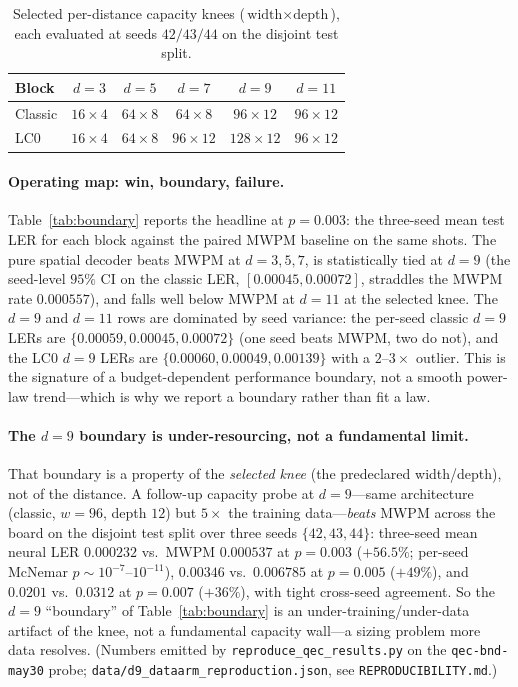 \documentclass[11pt,a4paper]{article}
\begin{document}
\begin{table}[htbp]
\centering
\caption{Selected per-distance capacity knees
($\textrm{width}\times\textrm{depth}$), each evaluated at seeds $42/43/44$
on the disjoint test split.}
\label{tab:knees}
\begin{tabular}{@{}lccccc@{}}
\toprule
Block & $d{=}3$ & $d{=}5$ & $d{=}7$ & $d{=}9$ & $d{=}11$ \\
\midrule
Classic & $16{\times}4$ & $64{\times}8$ & $64{\times}8$ & $96{\times}12$ & $96{\times}12$ \\
LC0     & $16{\times}4$ & $64{\times}8$ & $96{\times}12$ & $128{\times}12$ & $96{\times}12$ \\
\bottomrule
\end{tabular}
\end{table}

\paragraph{Operating map: win, boundary, failure.}
Table~\ref{tab:boundary} reports the headline at $p=0.003$: the three-seed
mean test LER for each block against the paired MWPM baseline on the same
shots. The pure spatial decoder beats MWPM at $d=3,5,7$, is statistically
tied at $d=9$ (the seed-level $95\%$ CI on the classic LER,
$[0.00045,0.00072]$, straddles the MWPM rate $0.000557$), and falls well
below MWPM at $d=11$ at the selected knee. The $d=9$ and $d=11$ rows are
dominated by seed variance: the per-seed classic $d=9$ LERs are
$\{0.00059,0.00045,0.00072\}$ (one seed beats MWPM, two do not), and the
LC0 $d=9$ LERs are $\{0.00060,0.00049,0.00139\}$ with a $2$--$3\times$
outlier. This is the signature of a budget-dependent performance boundary, not a smooth
power-law trend---which is why we report a boundary rather than fit a law.

\paragraph{The $d=9$ boundary is under-resourcing, not a fundamental limit.}
That boundary is a property of the \emph{selected knee} (the predeclared
width/depth), not of the distance. A follow-up capacity probe at $d=9$---same
architecture (classic, $w{=}96$, depth $12$) but $5\times$ the training
data---\emph{beats} MWPM across the board on the disjoint test split over three
seeds $\{42,43,44\}$: three-seed mean neural LER $0.000232$ vs.\ MWPM $0.000537$
at $p=0.003$ ($+56.5\%$; per-seed McNemar $p\!\sim\!10^{-7}$--$10^{-11}$),
$0.00346$ vs.\ $0.006785$ at $p=0.005$ ($+49\%$), and $0.0201$ vs.\ $0.0312$ at
$p=0.007$ ($+36\%$), with tight cross-seed agreement. So the $d=9$ ``boundary''
of Table~\ref{tab:boundary} is an under-training/under-data artifact of the knee,
not a fundamental capacity wall---a sizing problem more data resolves. (Numbers
emitted by \texttt{reproduce\_qec\_results.py} on the \texttt{qec-bnd-may30}
probe; \texttt{data/d9\_dataarm\_reproduction.json}, see \texttt{REPRODUCIBILITY.md}.)
\end{document}
